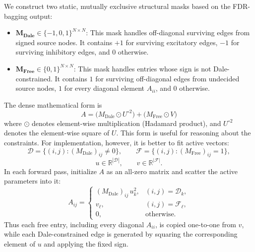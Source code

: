 \documentclass[11pt]{article}
\begin{document}
We construct two static, mutually exclusive structural masks based on the FDR-bagging output:
\begin{itemize}
    \item $\bm{M_{\text{Dale}}} \in \{-1, 0, 1\}^{N \times N}$: This mask handles off-diagonal surviving edges from signed source nodes. It contains $+1$ for surviving excitatory edges, $-1$ for surviving inhibitory edges, and $0$ otherwise.
    \item $\bm{M_{\text{Free}}} \in \{0, 1\}^{N \times N}$: This mask handles entries whose sign is not Dale-constrained. It contains $1$ for surviving off-diagonal edges from undecided source nodes, $1$ for every diagonal element $A_{ii}$, and $0$ otherwise.
\end{itemize}

The dense mathematical form is
\begin{equation}
\label{eq:dense-transform}
A = \big( M_{\text{Dale}} \odot U^{\circ 2} \big) + \big( M_{\text{Free}} \odot V \big)
\end{equation}
where $\odot$ denotes element-wise multiplication (Hadamard product), and $U^{\circ 2}$ denotes the element-wise square of $U$. This form is useful for reasoning about the constraints. For implementation, however, it is better to fit active vectors:
\begin{equation}
\label{eq:active-index-sets}
\mathcal{D}=\{(i,j):(M_{\text{Dale}})_{ij}\ne0\}, \qquad
\mathcal{F}=\{(i,j):(M_{\text{Free}})_{ij}=1\},
\end{equation}
\begin{equation}
\label{eq:active-vectors}
u\in\mathbb{R}^{|\mathcal{D}|}, \qquad
v\in\mathbb{R}^{|\mathcal{F}|}.
\end{equation}
In each forward pass, initialize $A$ as an all-zero matrix and scatter the active parameters into it:
\begin{equation}
\label{eq:active-scatter}
A_{ij} =
\begin{cases}
    (M_{\text{Dale}})_{ij}\,u_k^2, & (i,j)=\mathcal{D}_k,\\
    v_\ell, & (i,j)=\mathcal{F}_\ell,\\
    0, & \text{otherwise.}
\end{cases}
\end{equation}
Thus each free entry, including every diagonal $A_{ii}$, is copied one-to-one from $v$, while each Dale-constrained edge is generated by squaring the corresponding element of $u$ and applying the fixed sign.
\end{document}
